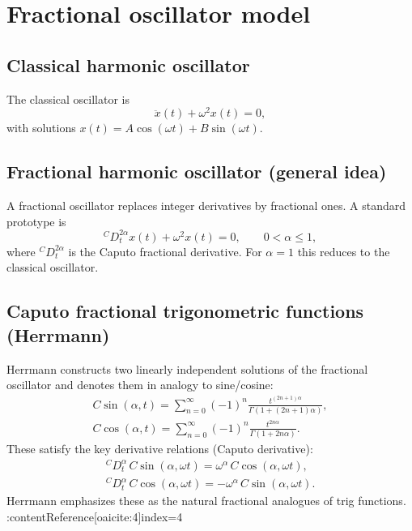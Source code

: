 
\section{Fractional oscillator model}

\subsection{Classical harmonic oscillator}
The classical oscillator is
\begin{equation}
\ddot{x}(t) + \omega^2 x(t)=0,
\end{equation}
with solutions $x(t)=A\cos(\omega t)+B\sin(\omega t)$.

\subsection{Fractional harmonic oscillator (general idea)}
A fractional oscillator replaces integer derivatives by fractional ones.
A standard prototype is
\begin{equation}
\boxed{
{}^{C}D_t^{2\alpha}x(t)+\omega^{2}x(t)=0,
\qquad 0<\alpha\le 1,
}
\end{equation}
where ${}^{C}D_t^{2\alpha}$ is the Caputo fractional derivative.
For $\alpha=1$ this reduces to the classical oscillator.

\subsection{Caputo fractional trigonometric functions (Herrmann)}
Herrmann constructs two linearly independent solutions of the fractional oscillator
and denotes them in analogy to sine/cosine:
\begin{align}
\boxed{
C\sin(\alpha,t)
=
\sum_{n=0}^{\infty}
(-1)^n
\frac{t^{(2n+1)\alpha}}{\Gamma(1+(2n+1)\alpha)},
}
\\[4pt]
\boxed{
C\cos(\alpha,t)
=
\sum_{n=0}^{\infty}
(-1)^n
\frac{t^{2n\alpha}}{\Gamma(1+2n\alpha)}.
}
\end{align}
These satisfy the key derivative relations (Caputo derivative):
\begin{align}
\boxed{
{}^{C}D_t^\alpha\,C\sin(\alpha,\omega t)=\omega^\alpha\,C\cos(\alpha,\omega t),
}
\\[4pt]
\boxed{
{}^{C}D_t^\alpha\,C\cos(\alpha,\omega t)=-\omega^\alpha\,C\sin(\alpha,\omega t).
}
\end{align}
Herrmann emphasizes these as the natural fractional analogues of trig functions. :contentReference[oaicite:4]{index=4}

